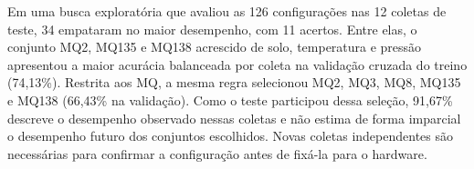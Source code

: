 Em uma busca exploratória que avaliou as 126 configurações nas 12 coletas de
teste, 34 empataram no maior desempenho, com 11 acertos. Entre elas, o conjunto
MQ2, MQ135 e MQ138 acrescido de solo, temperatura e pressão apresentou a maior
acurácia balanceada por coleta na validação cruzada do treino (74,13\%).
Restrita aos MQ, a mesma regra selecionou MQ2, MQ3, MQ8, MQ135 e MQ138
(66,43\% na validação). Como o teste participou dessa seleção, 91,67\% descreve
o desempenho observado nessas coletas e não estima de forma imparcial o
desempenho futuro dos conjuntos escolhidos. Novas coletas independentes são
necessárias para confirmar a configuração antes de fixá-la para o hardware.
